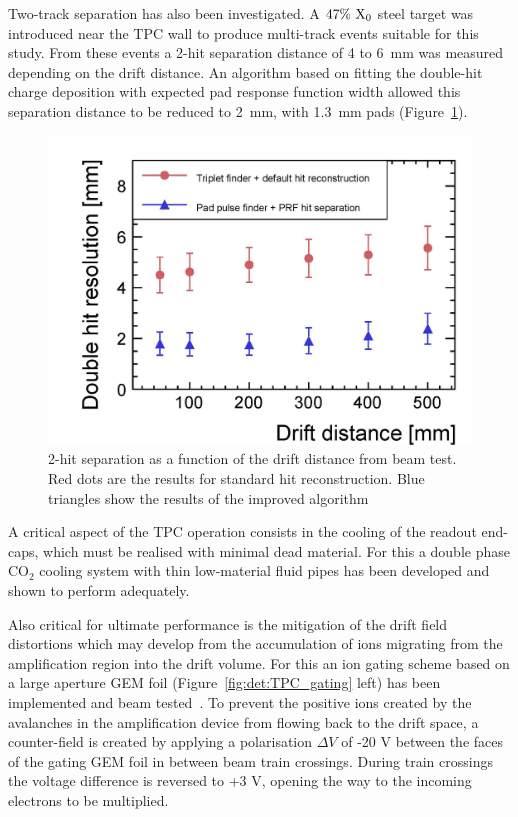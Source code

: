 Two-track separation has also been investigated. A $47\%~\rm{X_0}$ steel target was introduced near the TPC wall to produce multi-track events suitable for this study.
From these events a 2-hit separation distance of 4 to 6~mm was measured depending on the drift distance. An algorithm based on fitting the double-hit charge deposition with expected pad response function width allowed this separation distance to be reduced to 2~mm, with 1.3~mm pads (Figure~\ref{fig:det:TPC_separation}).

\begin{figure}[t!]
\centering
\includegraphics[width=0.7\hsize]{Detector/fig/TPC_separation.jpg}
\caption{2-hit separation as a function of the drift distance from beam test. Red dots are the results for standard hit reconstruction. Blue triangles show the results of the improved algorithm}
\label{fig:det:TPC_separation}
\end{figure}

A critical aspect of the TPC operation consists in the cooling of the readout end-caps, which must be realised with minimal dead material.  For this a double phase $\mathrm{CO}_2$ cooling system with thin low-material fluid pipes has been developed and shown to perform adequately. 

Also critical for ultimate performance is the mitigation of the drift field distortions which may develop from the accumulation of ions migrating from the amplification region into the drift volume. For this an ion gating scheme based on a large aperture GEM foil (Figure~\ref{fig:det:TPC_gating} left) has been implemented and beam tested~\cite{ild:bib:TPC_gatinginbeam}. To prevent the positive ions created by the avalanches in the amplification device from flowing back to the drift space, a counter-field is created by applying a polarisation $\Delta V$ of -20 V between the faces of the gating GEM foil in between beam train crossings. During train crossings the voltage difference is reversed to +3 V, opening the way to the incoming electrons to be multiplied. 

